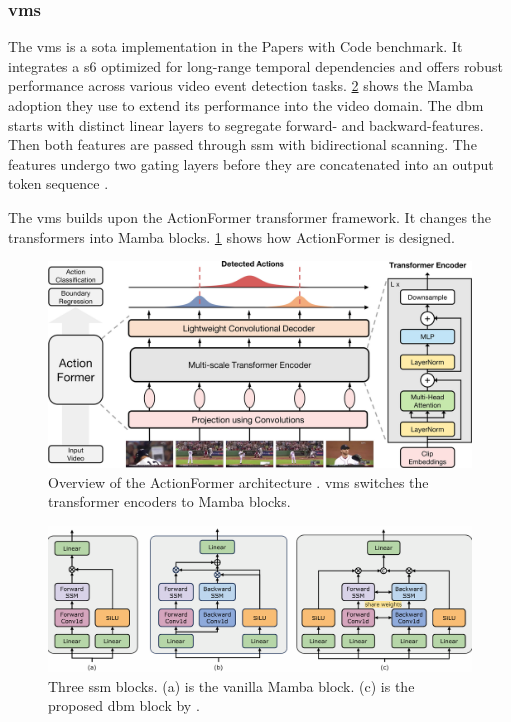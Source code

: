 \subsubsection{\acrfull{vms}}
The \acrfull{vms} is a \acrfull{sota} implementation in the Papers with Code benchmark. It integrates a \acrlong{s6} optimized for long-range temporal dependencies and offers robust performance across various video event detection tasks. \cref{fig:mamba_ssm} shows the Mamba adoption they use to extend its performance into the video domain. The \acrfull{dbm} starts with distinct linear layers to segregate forward- and backward-features. Then both features are passed through \acrshort{ssm} with bidirectional scanning. The features undergo two gating layers before they are concatenated into an output token sequence \cite{li_videomamba_2024}. 

The \acrlong{vms} builds upon the ActionFormer transformer framework. It changes the transformers into Mamba blocks. \cref{fig:actionformer_architecture} shows how ActionFormer is designed. 

\begin{figure}
    \centering
    \includegraphics[width=1\linewidth]{figures/actionformer_architecture.jpg}
    \caption{Overview of the ActionFormer architecture \cite{zhang_actionformer_2022} . \acrshort{vms} switches the transformer encoders to Mamba blocks. }
    \label{fig:actionformer_architecture}
\end{figure}

\begin{figure}
    \centering
    \includegraphics[width=1\linewidth]{figures/mamba_ssm.png}
    \caption{Three \acrshort{ssm} blocks. (a) is the vanilla Mamba block\cite{gu_mamba_2024}. (c) is the proposed \acrshort{dbm} block by \textcite{li_videomamba_2024}.}
    \label{fig:mamba_ssm}
\end{figure}


